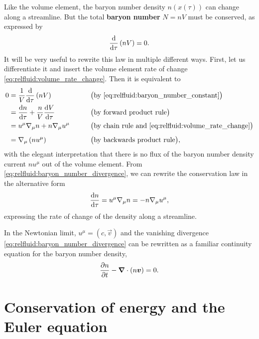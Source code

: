 Like the volume element, the baryon number density $n(x(\tau))$ can change along a streamline.
But the total \textbf{baryon number} $N = n V$ must be conserved, as expressed by
\begin{equation}
	\odv*{\left( n V \right)}{\tau} = 0 .
\label{eq:relfluid:baryon_number_constant}
\end{equation}
It will be very useful to rewrite this law in multiple different ways.
First, let us differentiate it and insert the volume element rate of change \eqref{eq:relfluid:volume_rate_change}.
Then it is equivalent to
\begin{align}
	0 &= \frac{1}{V} \odv*{\left( n V \right)}{\tau} && \qquad \big( \text{by \eqref{eq:relfluid:baryon_number_constant}} \big) \nonumber \\
	  &= \odv{n}{\tau} + \frac{n}{V} \odv{V}{\tau} && \qquad \big( \text{by forward product rule} \big) \nonumber \\
	  &= u^\mu \nabla_\mu n + n \nabla_\mu u^\mu && \qquad \big( \text{by chain rule and \eqref{eq:relfluid:volume_rate_change}} \big) \nonumber \\[1.0ex]
	  &= \nabla_\mu \left( n u^\mu \right) && \qquad \big( \text{by backwards product rule} \big), \label{eq:relfluid:baryon_number_divergence}
\end{align}
with the elegant interpretation that there is no flux of the baryon number density current $n u^\mu$ out of the volume element.
From \cref{eq:relfluid:baryon_number_divergence}, we can rewrite the conservation law in the alternative form
\begin{equation}
	\odv{n}{\tau} = u^\mu \nabla_\mu n
	              = -n \nabla_\mu u^\mu ,
\label{eq:relfluid:baryon_number_rate_change}
\end{equation}
expressing the rate of change of the density along a streamline.

In the Newtonian limit, $u^\mu = (c, \vec{v})$ and the vanishing divergence \cref{eq:relfluid:baryon_number_divergence} can be rewritten as a familiar continuity equation for the baryon number density,
\begin{equation}
	\pdv{n}{t} - {\bm{\nabla}} \cdot \left( n {\bm{v}} \right) = 0.
\end{equation}

\section{Conservation of energy and the Euler equation}

